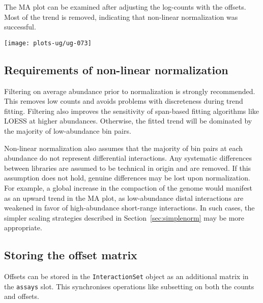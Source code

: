 \documentclass[12pt]{report}
\renewenvironment{Schunk}{\vspace{0pt}}{\vspace{0pt}}
\newcommand{\code}[1]{{\small\texttt{#1}}}
\begin{document}
The MA plot can be examined after adjusting the log-counts with the offsets.
Most of the trend is removed, indicating that non-linear normalization was successful.


\begin{Schunk}
\end{Schunk}

\begin{center}
\texttt{[image: plots-ug/ug-073]}
\end{center}

\subsection{Requirements of non-linear normalization}
Filtering on average abundance prior to normalization is strongly recommended.
This removes low counts and avoids problems with discreteness during trend fitting.
Filtering also improves the sensitivity of span-based fitting algorithms like LOESS at higher abundances.
Otherwise, the fitted trend will be dominated by the majority of low-abundance bin pairs.

Non-linear normalization also assumes that the majority of bin pairs at each abundance do not represent differential interactions.
Any systematic differences between libraries are assumed to be technical in origin and are removed.
If this assumption does not hold, genuine differences may be lost upon normalization.
For example, a global increase in the compaction of the genome would manifest as an upward trend in the MA plot, as low-abundance distal interactions are weakened in favor of high-abundance short-range interactions.
In such cases, the simpler scaling strategies described in Section~\ref{sec:simplenorm} may be more appropriate.

\subsection{Storing the offset matrix}
Offsets can be stored in the \code{InteractionSet} object as an additional matrix in the \code{assays} slot.
This synchronises operations like subsetting on both the counts and offsets.
\end{document}
